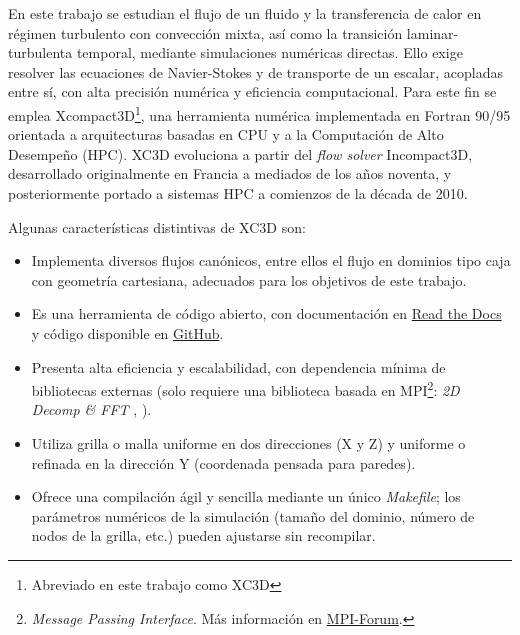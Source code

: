 En este trabajo se estudian el flujo de un fluido y la transferencia de calor en régimen turbulento con convección mixta, así como la transición laminar-turbulenta temporal, mediante simulaciones numéricas directas. Ello exige resolver las ecuaciones de Navier-Stokes y de transporte de un escalar, acopladas entre sí, con alta precisión numérica y eficiencia computacional. Para este fin se emplea Xcompact3D\footnote{Abreviado en este trabajo como XC3D}, una herramienta numérica implementada en Fortran 90/95 orientada a arquitecturas basadas en CPU y a la Computación de Alto Desempeño (HPC). XC3D evoluciona a partir del \textit{flow solver} Incompact3D, desarrollado originalmente en Francia a mediados de los años noventa, y posteriormente portado a sistemas HPC a comienzos de la década de 2010.

Algunas características distintivas de XC3D son:
\begin{itemize}
\item Implementa diversos flujos canónicos, entre ellos el flujo en dominios tipo caja con geometría cartesiana, adecuados para los objetivos de este trabajo.
\item Es una herramienta de código abierto, con documentación en \href{https://xcompact3d.readthedocs.io/en/latest/}{Read the Docs} y código disponible en \href{https://github.com/xcompact3d}{GitHub}.
\item Presenta alta eficiencia y escalabilidad, con dependencia mínima de bibliotecas externas (solo requiere una biblioteca basada en MPI\footnote{\textit{Message Passing Interface}. Más información en \href{https://www.mpi-forum.org/}{MPI-Forum}.}: \textit{2D Decomp \& FFT} \cite{li20102decomp}, \cite{laizet2011incompact3d}).
\item Utiliza grilla o malla uniforme en dos direcciones (X y Z) y uniforme o refinada en la dirección Y (coordenada
pensada para paredes).
\item Ofrece una compilación ágil y sencilla mediante un único \textit{Makefile}; los parámetros numéricos de la simulación (tamaño del dominio, número de nodos de la grilla, etc.) pueden ajustarse sin recompilar.
\end{itemize}


